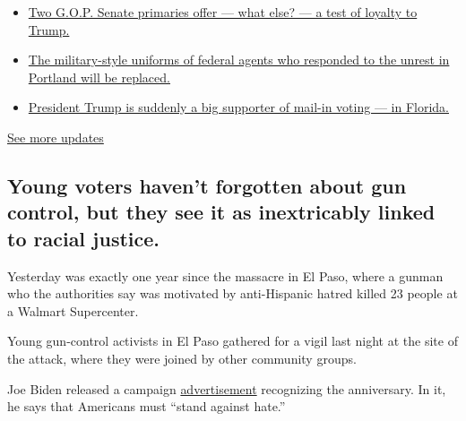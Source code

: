 \begin{itemize}
\tightlist
\item
  \href{https://www.nytimes3xbfgragh.onion/2020/08/04/us/elections/primary-election-michigan-arizona-kansas.html?action=click\&pgtype=Article\&state=default\&region=MAIN_CONTENT_1\&context=storylines_live_updates\#link-3924dd44}{Two
  G.O.P. Senate primaries offer --- what else? --- a test of loyalty to
  Trump.}
\item
  \href{https://www.nytimes3xbfgragh.onion/2020/08/04/us/elections/primary-election-michigan-arizona-kansas.html?action=click\&pgtype=Article\&state=default\&region=MAIN_CONTENT_1\&context=storylines_live_updates\#link-62a8e06b}{The
  military-style uniforms of federal agents who responded to the unrest
  in Portland will be replaced.}
\item
  \href{https://www.nytimes3xbfgragh.onion/2020/08/04/us/elections/primary-election-michigan-arizona-kansas.html?action=click\&pgtype=Article\&state=default\&region=MAIN_CONTENT_1\&context=storylines_live_updates\#link-32b39e33}{President
  Trump is suddenly a big supporter of mail-in voting --- in Florida.}
\end{itemize}

\href{https://www.nytimes3xbfgragh.onion/2020/08/04/us/elections/primary-election-michigan-arizona-kansas.html?action=click\&pgtype=Article\&state=default\&region=MAIN_CONTENT_1\&context=storylines_live_updates}{See
more updates}

\hypertarget{young-voters-havent-forgotten-about-gun-control-but-they-see-it-as-inextricably-linked-to-racial-justice}{%
\subsection{Young voters haven't forgotten about gun control, but they
see it as inextricably linked to racial
justice.}\label{young-voters-havent-forgotten-about-gun-control-but-they-see-it-as-inextricably-linked-to-racial-justice}}

Yesterday was exactly one year since the massacre in El Paso, where a
gunman who the authorities say was motivated by anti-Hispanic hatred
killed 23 people at a Walmart Supercenter.

Young gun-control activists in El Paso gathered for a vigil last night
at the site of the attack, where they were joined by other community
groups.

Joe Biden released a campaign
\href{https://www.youtube.com/watch?v=BbQQEPwarmU}{advertisement}
recognizing the anniversary. In it, he says that Americans must ``stand
against hate.''

